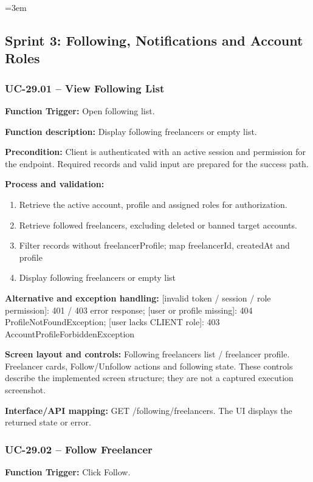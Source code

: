 \begingroup\sloppy\emergencystretch=3em\relax
\subsection{Sprint 3: Following, Notifications and Account Roles}

\subsubsection{UC-29.01 -- View Following List}
\textbf{Function Trigger:} Open following list.

\textbf{Function description:} Display following freelancers or empty list.

\textbf{Precondition:} Client is authenticated with an active session and permission for the endpoint. Required records and valid input are prepared for the success path.

\textbf{Process and validation:}
\begin{enumerate}
\item Retrieve the active account, profile and assigned roles for authorization.
\item Retrieve followed freelancers, excluding deleted or banned target accounts.
\item Filter records without freelancer\allowbreak{}Profile; map freelancer\allowbreak{}Id, created\allowbreak{}At and profile
\item Display following freelancers or empty list
\end{enumerate}
\textbf{Alternative and exception handling:} [invalid token /\allowbreak{} session /\allowbreak{} role permission]: 401 /\allowbreak{} 403 error response; [user or profile missing]: 404 Profile\allowbreak{}Not\allowbreak{}Found\allowbreak{}Exception; [user lacks CLIENT role]: 403 Account\allowbreak{}Profile\allowbreak{}Forbidden\allowbreak{}Exception

\textbf{Screen layout and controls:} Following freelancers list /\allowbreak{} freelancer profile. Freelancer cards, Follow/\allowbreak{}Unfollow actions and following state. These controls describe the implemented screen structure; they are not a captured execution screenshot.

\textbf{Interface/\allowbreak{}API mapping:} GET /\allowbreak{}following/\allowbreak{}freelancers. The UI displays the returned state or error.

\subsubsection{UC-29.02 -- Follow Freelancer}
\textbf{Function Trigger:} Click Follow.

